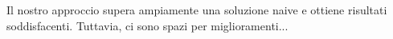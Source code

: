 Il nostro approccio supera ampiamente una soluzione naive e ottiene risultati soddisfacenti. Tuttavia, ci sono spazi per miglioramenti...